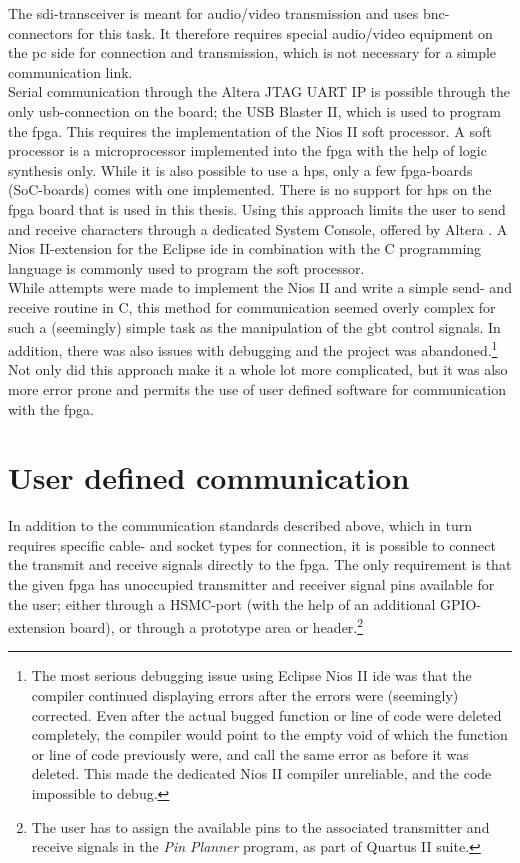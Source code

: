 \documentclass[main.tex]{subfiles}
\begin{document}
The \acrshort{sdi}-transceiver is meant for audio/video transmission and uses \acrshort{bnc}-connectors for this task. It therefore requires special audio/video equipment on the \gls{pc} side for connection and transmission, which is not necessary for a simple communication link.\\

Serial communication through the Altera JTAG UART IP is possible through the only \acrshort{usb}-connection on the board; the USB Blaster II, which is used to program the \gls{fpga}. This requires the implementation of the Nios II soft processor. A soft processor is a microprocessor implemented into the \gls{fpga} with the help of logic synthesis only. While it is also possible to use a \gls{hps}, only a few \gls{fpga}-boards (SoC-boards) comes with one implemented. There is no support for \gls{hps} on the \gls{fpga} board that is used in this thesis. Using this approach limits the user to send and receive characters through a dedicated System Console, offered by Altera \cite{altera_terminals14}. A Nios II-extension for the Eclipse \acrshort{ide} in combination with the C programming language is commonly used to program the soft processor.\\

While attempts were made to implement the Nios II and write a simple send- and receive routine in C, this method for communication seemed overly complex for such a (seemingly) simple task as the manipulation of the \gls{gbt} control signals. In addition, there was also issues with debugging and the project was abandoned.\footnote{The most serious debugging issue using Eclipse Nios II \acrshort{ide} was that the compiler continued displaying errors after the errors were (seemingly) corrected. Even after the actual bugged function or line of code were deleted completely, the compiler would point to the empty void of which the function or line of code previously were, and call the same error as before it was deleted. This made the dedicated Nios II compiler unreliable, and the code impossible to debug.} Not only did this approach make it a whole lot more complicated, but it was also more error prone and permits the use of user defined software for communication with the \gls{fpga}.

\section{User defined communication}

In addition to the communication standards described above, which in turn requires specific cable- and socket types for connection, it is possible to connect the transmit and receive signals directly to the \gls{fpga}. The only requirement is that the given \gls{fpga} has unoccupied transmitter and receiver signal pins available for the user; either through a HSMC-port (with the help of an additional GPIO-extension board), or through a prototype area or header.\footnote{The user has to assign the available pins to the associated transmitter and receive signals in the \textit{Pin Planner} program, as part of Quartus II suite.}\\
\end{document}
